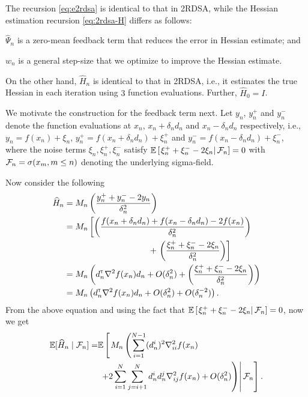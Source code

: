 \documentclass[letterpaper, 10 pt, conference]{ieeeconf}  %
\begin{document}
The recursion \eqref{eq:e2rdsa} is identical to that in 2RDSA, while the Hessian estimation recursion \eqref{eq:2rdsa-H} differs as follows:
\begin{inparaenum}[\bfseries (i)]
\item  $\widehat \Psi_n$ is a zero-mean feedback term that reduces the error in Hessian estimate; and
\item $w_n$ is a general step-size that we optimize to improve the Hessian estimate.
\end{inparaenum}
On the other hand, $\widehat H_n$ is identical to that in 2RDSA, i.e., it estimates the true Hessian in each iteration using $3$ function evaluations. Further, $\widehat H_0 = I$. 

We motivate the construction for the feedback term next.
Let $y_n$, $y_n^+$ and $y_n^-$ denote the function evaluations at $x_n$, $x_n+\delta_n d_n$ and $x_n - \delta_n d_n$ respectively, i.e., 
$y_n = f(x_n) + \xi_n$, $y_n^+ = f(x_n+\delta_n d_n) + \xi_n^+$ and 
$y_n^- = f(x_n-\delta_n d_n) + \xi_n^-$,
where the noise terms $\xi_n, \xi_n^+, \xi_n^-$ satisfy $\mathbb{E}\left[\left.\xi_n^+ + \xi_n^- - 2\xi_n \right| \mathcal{F}_n\right] = 0$ with $\mathcal{F}_n = \sigma(x_m,m\le n)$ denoting the underlying sigma-field.


Now consider the following 
\begin{align}
\widehat H_n & = M_n \left(\dfrac{y_n^+ + y_n^- - 2 y_n}{\delta_n^2}\right) \nonumber \\
& =  M_n \left[\left(\dfrac{f(x_n+\delta_n d_n) + f(x_n-\delta_n d_n) - 2 f(x_n)}{\delta_n^2}\right) \right.\nonumber \\&\hspace{10em}+\left. \left(\dfrac{\xi_n^+ + \xi_n^- - 2 \xi_n}{\delta_n^2}\right)\right] \nonumber \\
& = M_n \left(d_n\tr \nabla^2 f(x_n) d_n +  O(\delta_n^2) + \left(\dfrac{\xi_n^+ + \xi_n^- - 2 \xi_n}{\delta_n^2} \right)\right)\nonumber \\
& = M_n \left(d_n\tr \nabla^2 f(x_n) d_n +  O(\delta_n^2) + O(\delta_n^{-2})\right). \label{eq:h0}
\end{align}
From the above equation and using the fact that $\mathbb{E}\left[\left.\xi_n^+ + \xi_n^- - 2\xi_n \right| \mathcal{F}_n\right] = 0$, now we get
\begin{align}
\mathbb{E}[\widehat H_n \mid \mathcal{F}_n] = &  \mathbb{E}\left[\left. M_n \left(\sum\limits_{i=1}^{N-1} (d_n^i)^2 \nabla^2_{ii} f(x_n) \right.\right.\right.\nonumber\\
&\left.\left.\left.+ 2\sum\limits_{i=1}^N\sum\limits_{j=i+1}^N d_n^i d_n^j \nabla^2_{ij} f(x_n) + O(\delta_n^2)\right)\right| \mathcal{F}_n\right]. \label{eq:h1}
\end{align}
\end{document}
